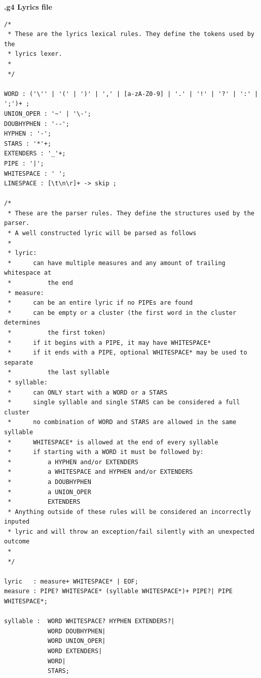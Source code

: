 \documentclass[12pt]{book}
\begin{document}
\newpage

\bigskip
\centerline{{\large \bf .g4 Lyrics file }}
\bigskip

\begin{verbatim}
/*
 * These are the lyrics lexical rules. They define the tokens used by the 
 * lyrics lexer.
 * 
 */

WORD : ('\'' | '(' | ')' | ',' | [a-zA-Z0-9] | '.' | '!' | '?' | ':' | ';')+ ;
UNION_OPER : '~' | '\-';
DOUBHYPHEN : '--';
HYPHEN : '-';
STARS : '*'+;
EXTENDERS : '_'+;
PIPE : '|';
WHITESPACE : ' ';
LINESPACE : [\t\n\r]+ -> skip ;

/*
 * These are the parser rules. They define the structures used by the parser.
 * A well constructed lyric will be parsed as follows
 * 
 * lyric:
 *      can have multiple measures and any amount of trailing whitespace at 
 *			the end
 * measure:
 *      can be an entire lyric if no PIPEs are found
 *      can be empty or a cluster (the first word in the cluster determines 
 * 			the first token)
 *      if it begins with a PIPE, it may have WHITESPACE*
 *      if it ends with a PIPE, optional WHITESPACE* may be used to separate 
 * 			the last syllable
 * syllable:
 *      can ONLY start with a WORD or a STARS
 *      single syllable and single STARS can be considered a full cluster
 *      no combination of WORD and STARS are allowed in the same syllable
 *      WHITESPACE* is allowed at the end of every syllable
 *      if starting with a WORD it must be followed by: 
 *          a HYPHEN and/or EXTENDERS
 *          a WHITESPACE and HYPHEN and/or EXTENDERS
 *          a DOUBHYPHEN
 *          a UNION_OPER  
 *          EXTENDERS
 * Anything outside of these rules will be considered an incorrectly inputed 
 * lyric and will throw an exception/fail silently with an unexpected outcome
 *      
 */

lyric   : measure+ WHITESPACE* | EOF;
measure : PIPE? WHITESPACE* (syllable WHITESPACE*)+ PIPE?| PIPE WHITESPACE*;

syllable :  WORD WHITESPACE? HYPHEN EXTENDERS?| 
            WORD DOUBHYPHEN| 
            WORD UNION_OPER| 
            WORD EXTENDERS| 
            WORD|
            STARS;
\end{verbatim}
\bigskip
\end{document}
